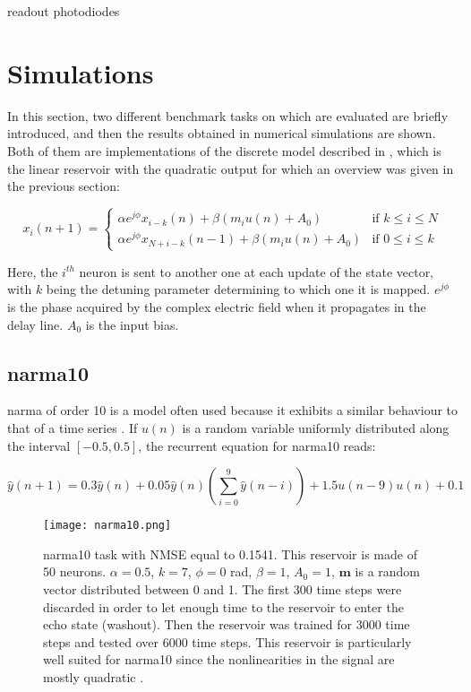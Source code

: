 readout photodiodes \cite{Vinckier2015}

\section{Simulations}

In this section, two different benchmark tasks on which \rcer are evaluated are briefly introduced, and then the results obtained in numerical simulations are shown. Both of them are implementations of the discrete model described in \cite{Vinckier2015}, which is the linear reservoir with the quadratic output for which an overview was given in the previous section:

\begin{equation}
	x_i(n+1) = 
	\begin{cases}
		\alpha e^{j\phi} x_{i-k}(n)+\beta \left(m_i u(n) +A_0 \right) & \text{if } k \leq i \leq N\\
		\alpha e^{j\phi} x_{N+i-k}(n-1)+\beta \left(m_i u(n) +A_0 \right) & \text{if } 0 \leq i \leq k			
	\end{cases}
\end{equation}

Here, the $i^{th}$ neuron is sent to another one at each update of the state vector, with $k$ being the detuning parameter determining to which one it is mapped. $e^{j\phi}$ is the phase acquired by the complex electric field when it propagates in the delay line. $A_0$ is the input bias.

\subsection{\gls{narma}10}

\acrlong{narma} of order 10 is a model often used because it exhibits a similar behaviour to that of a time series \cite{Paquot2012}. If $u(n)$ is a random variable uniformly distributed along the interval $[-0.5, 0.5]$, the recurrent equation for \gls{narma}10 reads:

\begin{equation}
	\hat{y}(n+1) = 0.3\hat{y}(n)+0.05\hat{y}(n)\left(\sum_{i=0}^9 \hat{y}(n-i) \right)+1.5u(n-9)u(n)+0.1
\end{equation}

\begin{figure}[h]
	\centering
	\texttt{[image: narma10.png]}
	\caption{\gls{narma}10 task with NMSE equal to 0.1541. This reservoir is made of 50 neurons. $\alpha=0.5$, $k=7$, $\phi=0$ rad, $\beta=1$, $A_0=1$, $\mathbf{m}$ is a random vector distributed between 0 and 1. The first 300 time steps were discarded in order to let enough time to the reservoir to enter the echo state (washout). Then the reservoir was trained for 3000 time steps and tested over 6000 time steps. This reservoir is particularly well suited for  \gls{narma}10 since the nonlinearities in the signal are mostly quadratic \cite{Vinckier2015}.}
	\label{narma10}
\end{figure}


